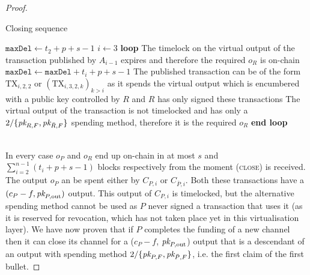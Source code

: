 \begin{proof}
  \begin{center}
    \begin{notitlebox}{Closing sequence}
      \begin{algorithmic}[1]
        \State $\texttt{maxDel} \gets t_2 + p + s - 1$ 
        \State $i \gets 3$
        \label{code:settling-process:init-i}
        \State \textbf{loop}
        \Indent
            \State The timelock on the virtual output of the transaction
            published by $A_{i-1}$ expires and therefore the required $o_R$ is
            on-chain
          \Else \: 
            \State $\texttt{maxDel} \gets \texttt{maxDel} + t_i + p + s - 1$
            \State The published transaction can be of the form $\mathrm{TX}_{i,
            2, 2}$ or $(\mathrm{TX}_{i, 3, 2, k})_{k > i}$ as it spends the
            virtual output which is encumbered with a public key controlled by
            $R$ and $R$ has only signed these transactions
             
              \State The virtual output of the transaction is not timelocked and
              has only a $2/\{\textit{pk}_{R, F}, \textit{pk}_{\bar{R}, F}\}$ spending method,
              therefore it is the required $o_R$
            \Else \: 
              \label{code:settling-process:increment}
            \EndIf
          \EndIf
        \EndIndent
        \State \textbf{end loop}
        \State {}
      \end{algorithmic}
    \end{notitlebox}
    \label{code:settling-process}
  \end{center} \ \\

  In every case $o_P$ and $o_R$ end up on-chain in at most $s$ and
  $\sum\limits_{i=2}^{n-1}(t_i + p + s - 1)$ blocks respectively from the moment
  (\textsc{close}) is received. The output $o_P$ an be spent either by $C_{P,
  i}$ or $C_{\bar{P}, i}$. Both these transactions have a $(c_P - f, \textit{pk}_{P,
  \mathrm{out}})$ output. This output of $C_{P, i}$ is timelocked, but the
  alternative spending method cannot be used as $P$ never signed a transaction
  that uses it (as it is reserved for revocation, which has not taken place yet
  in this virtualisation layer). We have now proven that if $P$ completes the
  funding of a new channel then it can close its channel for a ($c_P - f$,
  $\textit{pk}_{P, \mathrm{out}}$) output that is a descendant of an output with spending
  method $2/\{\textit{pk}_{P, F}, \textit{pk}_{\bar{P}, F}\}$, i.e. the first claim of the first
  bullet.


\end{proof}
